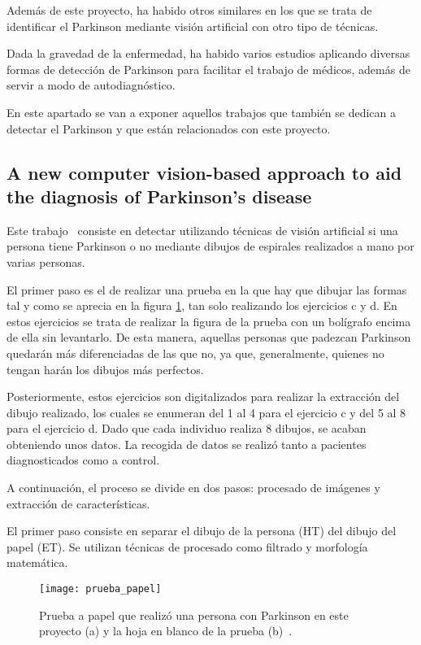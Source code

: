 Además de este proyecto, ha habido otros similares en los que se trata de identificar el Parkinson mediante visión artificial con otro tipo de técnicas.

Dada la gravedad de la enfermedad, ha habido varios estudios aplicando diversas formas de detección de Parkinson para facilitar el trabajo de médicos, además de servir a modo de autodiagnóstico.

En este apartado se van a exponer aquellos trabajos que también se dedican a detectar el Parkinson y que están relacionados con este proyecto.

\subsection{A new computer vision-based approach to aid the diagnosis of Parkinson's disease}
Este trabajo~\cite{pereira2016new} consiste en detectar utilizando técnicas de visión artificial si una persona tiene Parkinson o no mediante dibujos de espirales realizados a mano por varias personas.

El primer paso es el de realizar una prueba en la que hay que dibujar las formas tal y como se aprecia en la figura \ref{fig:pruebapapel}, tan solo realizando los ejercicios c y d. En estos ejercicios se trata de realizar la figura de la prueba con un bolígrafo encima de ella sin levantarlo. De esta manera, aquellas personas que padezcan Parkinson quedarán más diferenciadas de las que no, ya que, generalmente, quienes no tengan harán los dibujos más perfectos.

Posteriormente, estos ejercicios son digitalizados para realizar la extracción del dibujo realizado, los cuales se enumeran del 1 al 4 para el ejercicio c y del 5 al 8 para el ejercicio d. Dado que cada individuo realiza 8 dibujos, se acaban obteniendo unos datos. La recogida de datos se realizó tanto a pacientes diagnosticados como a control.

A continuación, el proceso se divide en dos pasos: procesado de imágenes y extracción de características.

El primer paso consiste en separar el dibujo de la persona (HT) del dibujo del papel (ET). Se utilizan técnicas de procesado como filtrado y morfología matemática.

\begin{figure}[ht]
	\texttt{[image: prueba\_papel]}
	\caption[Prueba a papel que realizó una persona con Parkinson en este proyecto y la hoja en blanco de la prueba.]{Prueba a papel que realizó una persona con Parkinson en este proyecto (a) y la hoja en blanco de la prueba (b)~\cite{pereira2016new}.}
	\label{fig:pruebapapel}
\end{figure}

